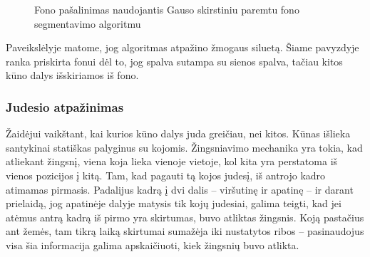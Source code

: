 \documentclass{VUMIFPSbakalaurinis}
\begin{document}
\begin{figure}[H]
    \centering
    \qquad
    \caption{Fono pašalinimas naudojantis Gauso skirstiniu paremtu fono segmentavimo algoritmu}
    \label{fig:example}
\end{figure}


Paveikslėlyje matome, jog algoritmas atpažino žmogaus siluetą. Šiame pavyzdyje ranka priskirta fonui dėl to, jog spalva sutampa su sienos spalva, tačiau kitos kūno dalys išskiriamos iš fono.

\subsubsection{Judesio atpažinimas}\label{section:movement}

Žaidėjui vaikštant, kai kurios kūno dalys juda greičiau, nei kitos. Kūnas išlieka santykinai statiškas palyginus su kojomis. Žingsniavimo mechanika yra tokia, kad atliekant žingsnį, viena koja lieka vienoje vietoje, kol kita yra perstatoma iš vienos pozicijos į kitą. Tam, kad pagauti tą kojos judesį, iš antrojo kadro atimamas pirmasis. Padalijus kadrą į dvi dalis – viršutinę ir apatinę – ir darant prielaidą, jog apatinėje dalyje matysis tik kojų judesiai, galima teigti, kad jei atėmus antrą kadrą iš pirmo yra skirtumas, buvo atliktas žingsnis. Koją pastačius ant žemės, tam tikrą laiką skirtumai sumažėja iki nustatytos ribos – pasinaudojus visa šia informacija galima apskaičiuoti, kiek žingsnių buvo atlikta. 
\end{document}
